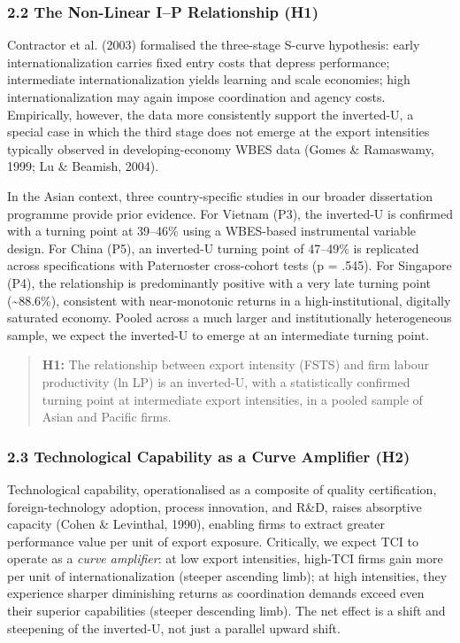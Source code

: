 \documentclass[12pt,a4paper]{article}
\begin{document}
\hypertarget{22-the-non-linear-ip-relationship-h1}{%
\subsubsection{2.2 The Non-Linear I--P Relationship
(H1)}\label{22-the-non-linear-ip-relationship-h1}}

Contractor et al. (2003) formalised the three-stage S-curve hypothesis:
early internationalization carries fixed entry costs that depress
performance; intermediate internationalization yields learning and scale
economies; high internationalization may again impose coordination and
agency costs. Empirically, however, the data more consistently support
the inverted-U, a special case in which the third stage does not emerge
at the export intensities typically observed in developing-economy WBES
data (Gomes \& Ramaswamy, 1999; Lu \& Beamish, 2004).

In the Asian context, three country-specific studies in our broader
dissertation programme provide prior evidence. For Vietnam (P3), the
inverted-U is confirmed with a turning point at 39--46\% using a
WBES-based instrumental variable design. For China (P5), an inverted-U
turning point of 47--49\% is replicated across specifications with
Paternoster cross-cohort tests (p = .545). For Singapore (P4), the
relationship is predominantly positive with a very late turning point
(\textasciitilde88.6\%), consistent with near-monotonic returns in a
high-institutional, digitally saturated economy. Pooled across a much
larger and institutionally heterogeneous sample, we expect the
inverted-U to emerge at an intermediate turning point.

\begin{quote}
\textbf{H1:} The relationship between export intensity (FSTS) and firm
labour productivity (ln LP) is an inverted-U, with a statistically
confirmed turning point at intermediate export intensities, in a pooled
sample of Asian and Pacific firms.
\end{quote}

\hypertarget{23-technological-capability-as-a-curve-amplifier-h2}{%
\subsubsection{2.3 Technological Capability as a Curve Amplifier
(H2)}\label{23-technological-capability-as-a-curve-amplifier-h2}}

Technological capability, operationalised as a composite of quality
certification, foreign-technology adoption, process innovation, and
R\&D, raises absorptive capacity (Cohen \& Levinthal, 1990), enabling
firms to extract greater performance value per unit of export exposure.
Critically, we expect TCI to operate as a \emph{curve amplifier}: at low
export intensities, high-TCI firms gain more per unit of
internationalization (steeper ascending limb); at high intensities, they
experience sharper diminishing returns as coordination demands exceed
even their superior capabilities (steeper descending limb). The net
effect is a shift and steepening of the inverted-U, not just a parallel
upward shift.
\end{document}
